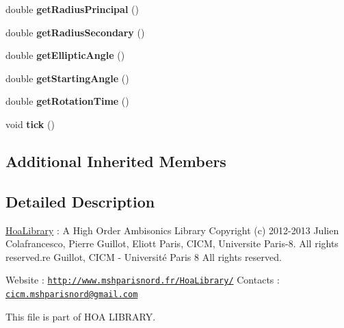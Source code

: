 \begin{DoxyCompactItemize}
\item 
\hypertarget{class_satellite_af2f23f7b666dbf9e386d85994384b0f5}{double {\bfseries get\-Radius\-Principal} ()}\label{class_satellite_af2f23f7b666dbf9e386d85994384b0f5}

\item 
\hypertarget{class_satellite_a0758e76c99704e1d8cb952e271abadc1}{double {\bfseries get\-Radius\-Secondary} ()}\label{class_satellite_a0758e76c99704e1d8cb952e271abadc1}

\item 
\hypertarget{class_satellite_a26c4d92baf96f1aa8013f60f11ddb38f}{double {\bfseries get\-Elliptic\-Angle} ()}\label{class_satellite_a26c4d92baf96f1aa8013f60f11ddb38f}

\item 
\hypertarget{class_satellite_a84c7ca20eb293a064204439bcec99a5c}{double {\bfseries get\-Starting\-Angle} ()}\label{class_satellite_a84c7ca20eb293a064204439bcec99a5c}

\item 
\hypertarget{class_satellite_a8c856bd8aff5e287d2f9814aea193608}{double {\bfseries get\-Rotation\-Time} ()}\label{class_satellite_a8c856bd8aff5e287d2f9814aea193608}

\item 
\hypertarget{class_satellite_ab181d393cae5eb8eab264ce690ecfc44}{void {\bfseries tick} ()}\label{class_satellite_ab181d393cae5eb8eab264ce690ecfc44}

\end{DoxyCompactItemize}
\subsection*{Additional Inherited Members}


\subsection{Detailed Description}
\hyperlink{interface_hoa_library}{Hoa\-Library} \-: A High Order Ambisonics Library Copyright (c) 2012-\/2013 Julien Colafrancesco, Pierre Guillot, Eliott Paris, C\-I\-C\-M, Universite Paris-\/8. All rights reserved.\-re Guillot, C\-I\-C\-M -\/ Université Paris 8 All rights reserved.

Website \-: \href{http://www.mshparisnord.fr/HoaLibrary/}{\tt http\-://www.\-mshparisnord.\-fr/\-Hoa\-Library/} Contacts \-: \href{mailto:cicm.mshparisnord@gmail.com}{\tt cicm.\-mshparisnord@gmail.\-com}

This file is part of H\-O\-A L\-I\-B\-R\-A\-R\-Y.

